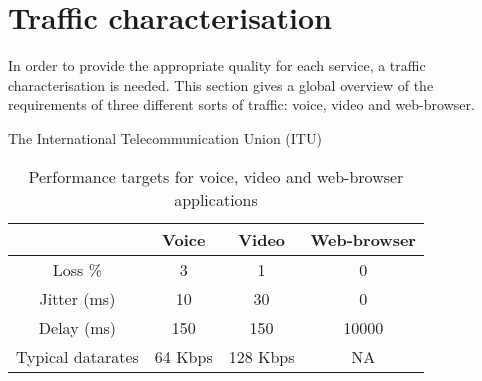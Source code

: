 \section{Traffic characterisation}
\label{sec:traf-char}

In order to provide the appropriate quality for each service, a traffic characterisation is needed. This section gives a global overview of the requirements of three different sorts of traffic: voice, video and web-browser. 

The International Telecommunication Union (ITU) \cite{ituG1010} 


\begin{table}[ht] 
\caption{Performance targets for voice, video and web-browser applications} %
\centering %
\begin{tabular}{c || c c c} %
\hline\hline %
  & Voice & Video & Web-browser \\ [0.5ex] %
\hline %
Loss \% & 3 & 1 & 0 \\   \hline %
Jitter (ms) & 10 & 30 & 0 \\   \hline
Delay (ms) & 150 & 150 & 10000 \\   \hline
Typical datarates & 64 Kbps & 128 Kbps & NA \\ [1ex] %
\hline %
\end{tabular} 
\label{table:trafchar} %
\end{table}
